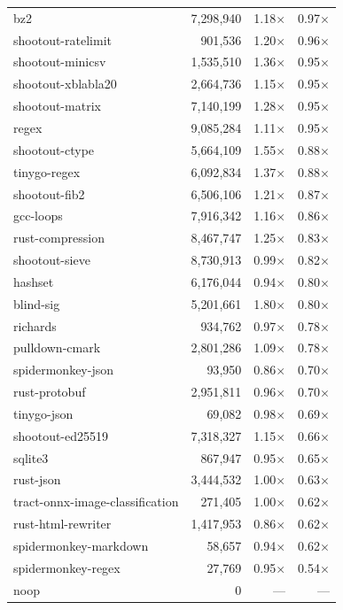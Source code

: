 \begin{longtable}{l r r r}
bz2 & 7{,}298{,}940 & 1.18$\times$ & 0.97$\times$ \\
shootout-ratelimit & 901{,}536 & 1.20$\times$ & 0.96$\times$ \\
shootout-minicsv & 1{,}535{,}510 & 1.36$\times$ & 0.95$\times$ \\
shootout-xblabla20 & 2{,}664{,}736 & 1.15$\times$ & 0.95$\times$ \\
shootout-matrix & 7{,}140{,}199 & 1.28$\times$ & 0.95$\times$ \\
regex & 9{,}085{,}284 & 1.11$\times$ & 0.95$\times$ \\
shootout-ctype & 5{,}664{,}109 & 1.55$\times$ & 0.88$\times$ \\
tinygo-regex & 6{,}092{,}834 & 1.37$\times$ & 0.88$\times$ \\
shootout-fib2 & 6{,}506{,}106 & 1.21$\times$ & 0.87$\times$ \\
gcc-loops & 7{,}916{,}342 & 1.16$\times$ & 0.86$\times$ \\
rust-compression & 8{,}467{,}747 & 1.25$\times$ & 0.83$\times$ \\
shootout-sieve & 8{,}730{,}913 & 0.99$\times$ & 0.82$\times$ \\
hashset & 6{,}176{,}044 & 0.94$\times$ & 0.80$\times$ \\
blind-sig & 5{,}201{,}661 & 1.80$\times$ & 0.80$\times$ \\
richards & 934{,}762 & 0.97$\times$ & 0.78$\times$ \\
pulldown-cmark & 2{,}801{,}286 & 1.09$\times$ & 0.78$\times$ \\
spidermonkey-json & 93{,}950 & 0.86$\times$ & 0.70$\times$ \\
rust-protobuf & 2{,}951{,}811 & 0.96$\times$ & 0.70$\times$ \\
tinygo-json & 69{,}082 & 0.98$\times$ & 0.69$\times$ \\
shootout-ed25519 & 7{,}318{,}327 & 1.15$\times$ & 0.66$\times$ \\
sqlite3 & 867{,}947 & 0.95$\times$ & 0.65$\times$ \\
rust-json & 3{,}444{,}532 & 1.00$\times$ & 0.63$\times$ \\
tract-onnx-image-classification & 271{,}405 & 1.00$\times$ & 0.62$\times$ \\
rust-html-rewriter & 1{,}417{,}953 & 0.86$\times$ & 0.62$\times$ \\
spidermonkey-markdown & 58{,}657 & 0.94$\times$ & 0.62$\times$ \\
spidermonkey-regex & 27{,}769 & 0.95$\times$ & 0.54$\times$ \\
noop & 0 & --- & --- \\
\end{longtable}

